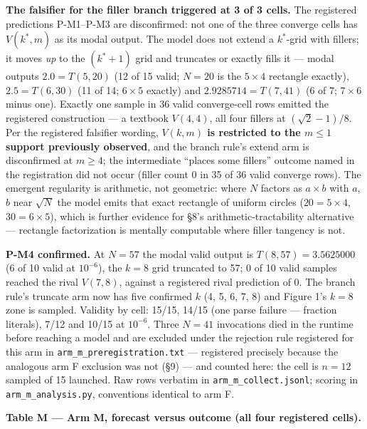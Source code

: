 \textbf{The falsifier for the filler branch triggered at 3 of 3 cells.} The registered predictions
P-M1--P-M3 are disconfirmed: not one of the three converge cells has $V(k^*, m)$ as its modal
output. The model does not extend a $k^*$-grid with fillers; it moves \emph{up} to the $(k^*{+}1)$ grid
and truncates or exactly fills it --- modal outputs $2.0 = T(5,20)$ (12 of 15 valid; $N = 20$ is the
$5 \times 4$ rectangle exactly), $2.5 = T(6,30)$ (11 of 14; $6 \times 5$ exactly) and $2.9285714 = T(7,41)$
(6 of 7; $7 \times 6$ minus one). Exactly one sample in 36 valid converge-cell rows emitted the
registered construction --- a textbook $V(4,4)$, all four fillers at $(\sqrt{2}-1)/8$. Per the
registered falsifier wording, \textbf{$V(k, m)$ is restricted to the $m \le 1$ support previously
observed}, and the branch rule's extend arm is disconfirmed at $m \ge 4$; the intermediate
``places some fillers'' outcome named in the registration did not occur (filler count 0 in 35
of 36 valid converge rows). The emergent regularity is arithmetic, not geometric: where $N$
factors as $a \times b$ with $a$, $b$ near $\sqrt{N}$ the model emits that exact rectangle of uniform circles
($20 = 5 \times 4$, $30 = 6 \times 5$), which is further evidence for \S8's arithmetic-tractability alternative
--- rectangle factorization is mentally computable where filler tangency is not.

\textbf{P-M4 confirmed.} At $N = 57$ the modal valid output is $T(8,57) = 3.5625000$ (6 of 10 valid at
$10^{-6}$), the $k = 8$ grid truncated to 57; 0 of 10 valid samples reached the rival $V(7,8)$, against
a registered rival prediction of 0. The branch rule's truncate arm now has five confirmed $k$
(4, 5, 6, 7, 8) and Figure 1's $k = 8$ zone is sampled. Validity by cell: 15/15, 14/15
(one parse failure --- fraction literals), 7/12 and 10/15 at $10^{-6}$. Three $N = 41$ invocations
died in the runtime before reaching a model and are excluded under the rejection rule
registered for this arm in \texttt{arm\_m\_preregistration.txt} --- registered precisely because the
analogous arm F exclusion was not (\S9) --- and counted here: the cell is $n = 12$ sampled of 15
launched. Raw rows verbatim in
\texttt{arm\_m\_collect.jsonl}; scoring in \texttt{arm\_m\_analysis.py}, conventions identical to arm F.

\textbf{Table M --- Arm M, forecast versus outcome (all four registered cells).}

